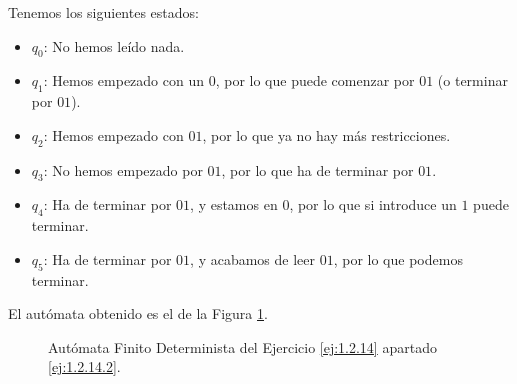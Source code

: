 \begin{ejercicio}
\begin{enumerate}
        Tenemos los siguientes estados:
        \begin{itemize}
            \item \ul{$q_0$}: No hemos leído nada.
            \item \ul{$q_1$}: Hemos empezado con un $0$, por lo que puede comenzar por $01$ (o terminar por $01$).
            \item \ul{$q_2$}: Hemos empezado con $01$, por lo que ya no hay más restricciones.
            \item \ul{$q_3$}: No hemos empezado por $01$, por lo que ha de terminar por $01$.
            \item \ul{$q_4$}: Ha de terminar por $01$, y estamos en $0$, por lo que si introduce un $1$ puede terminar.
            \item \ul{$q_5$}: Ha de terminar por $01$, y acabamos de leer $01$, por lo que podemos terminar.
        \end{itemize}

        El autómata obtenido es el de la Figura \ref{fig:ej:1.2.14.2}.
        \begin{figure}
            \centering
            \caption{Autómata Finito Determinista del Ejercicio \ref{ej:1.2.14} apartado \ref{ej:1.2.14.2}.}
            \label{fig:ej:1.2.14.2}
        \end{figure}


\end{enumerate}
\end{ejercicio}
